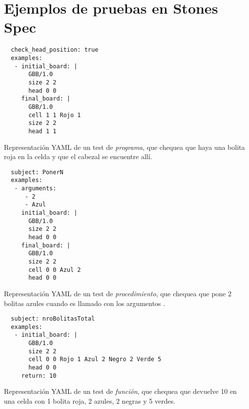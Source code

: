 
\renewcommand{\appendixname}{Apéndice}
\renewcommand{\appendixtocname}{Apéndice}
\renewcommand{\appendixpagename}{Apéndice}

\begin{appendices}

\label{app:Specs}
\section{Ejemplos de pruebas en Stones Spec}

\begin{listing}
  \centering

  \begin{verbatim}
  check_head_position: true
  examples:
   - initial_board: |
       GBB/1.0
       size 2 2
       head 0 0
     final_board: |
       GBB/1.0
       cell 1 1 Rojo 1
       size 2 2
       head 1 1
  \end{verbatim}

  \caption{Representación YAML de un test de \emph{programa}, que chequea que haya una bolita roja en la celda  y que el cabezal se encuentre allí.}
  \label{lst:ProgramSpec}
\end{listing}

\begin{listing}
  \centering

  \begin{verbatim}
  subject: PonerN
  examples:
   - arguments:
      - 2
      - Azul
     initial_board: |
       GBB/1.0
       size 2 2
       head 0 0
     final_board: |
       GBB/1.0
       size 2 2
       cell 0 0 Azul 2
       head 0 0
  \end{verbatim}

  \caption{Representación YAML de un test de \emph{procedimiento}, que chequea que  pone 2 bolitas azules cuando es llamado con los argumentos .}
  \label{lst:ProcedureSpec}
\end{listing}

\begin{listing}
  \centering

  \begin{verbatim}
  subject: nroBolitasTotal
  examples:
   - initial_board: |
       GBB/1.0
       size 2 2
       cell 0 0 Rojo 1 Azul 2 Negro 2 Verde 5
       head 0 0
     return: 10
  \end{verbatim}

  \caption{Representación YAML de un test de \emph{función}, que chequea que  devuelve 10 en una celda con 1 bolita roja, 2 azules, 2 negras y 5 verdes.}
  \label{lst:FunctionSpec}
\end{listing}

\end{appendices}

